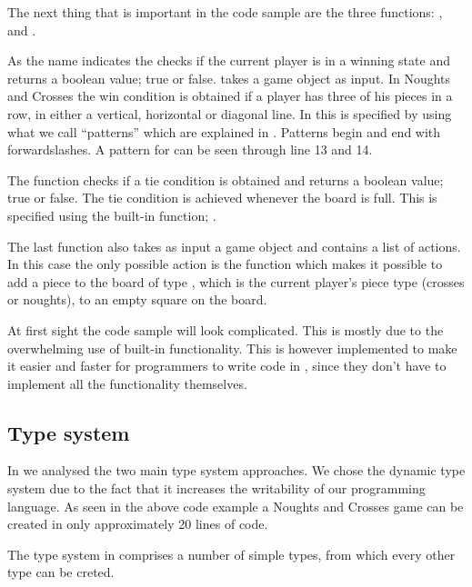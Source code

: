 The next thing that is important in the code sample are the three functions: 
,  and . 

As the name indicates the  checks if the current player
is in a winning state and returns a boolean value; true or false.
 takes a game object as input. In Noughts and Crosses the
win condition is obtained if a player has three of his pieces in a row, in
either a vertical, horizontal or diagonal line. In \productname{} this is
specified by using what we call ``patterns'' which are explained in
. Patterns begin and end with forwardslashes. A pattern for
 can be seen through line 13 and 14.

The  function checks if a tie condition is obtained and
returns a boolean value; true or false. The tie condition is achieved whenever
the board is full. This is specified using the built-in function;
. 

The last function  also takes as input a game object and
contains a list of actions. In this case the only possible action is the
 function which makes it possible to add a piece to the
board of type , which is the current player's piece type (crosses
or noughts), to an empty square on the board.

At first sight the code sample will look complicated. This is mostly due to the
overwhelming use of built-in functionality. This is however implemented to make
it easier and faster for programmers to write code in \productname{}, since they
don't have to implement all the functionality themselves.

\subsection*{Type system}

In  we analysed the two main type system
approaches.  We chose the dynamic type system due to the fact that it increases
the writability of our programming language. As seen in the above code example
 a Noughts and Crosses game can be created in only
approximately 20 lines of code.

The type system in \productname{} comprises a number of simple types, from which every other type
can be creted.


